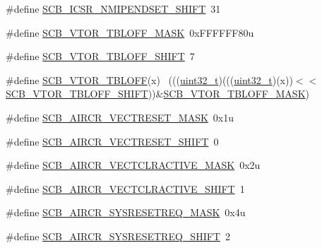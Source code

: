 \begin{DoxyCompactItemize}
\item 
\#define \hyperlink{group___s_c_b___register___masks_ga8a185fc794df7e755e5f3a8b3a06d042}{S\+C\+B\+\_\+\+I\+C\+S\+R\+\_\+\+N\+M\+I\+P\+E\+N\+D\+S\+E\+T\+\_\+\+S\+H\+I\+FT}~31
\item 
\#define \hyperlink{group___s_c_b___register___masks_ga07fd57e90baff628af14394c8142dc27}{S\+C\+B\+\_\+\+V\+T\+O\+R\+\_\+\+T\+B\+L\+O\+F\+F\+\_\+\+M\+A\+SK}~0x\+F\+F\+F\+F\+F\+F80u
\item 
\#define \hyperlink{group___s_c_b___register___masks_gac6092f3c78a9f126c2d02740a7976708}{S\+C\+B\+\_\+\+V\+T\+O\+R\+\_\+\+T\+B\+L\+O\+F\+F\+\_\+\+S\+H\+I\+FT}~7
\item 
\#define \hyperlink{group___s_c_b___register___masks_ga0fc8974ae1755bc9819c97712403b828}{S\+C\+B\+\_\+\+V\+T\+O\+R\+\_\+\+T\+B\+L\+O\+FF}(x)                                          ~(((\hyperlink{_p_e___types_8h_a33594304e786b158f3fb30289278f5af}{uint32\+\_\+t})(((\hyperlink{_p_e___types_8h_a33594304e786b158f3fb30289278f5af}{uint32\+\_\+t})(x))$<$$<$\hyperlink{group___s_c_b___register___masks_gac6092f3c78a9f126c2d02740a7976708}{S\+C\+B\+\_\+\+V\+T\+O\+R\+\_\+\+T\+B\+L\+O\+F\+F\+\_\+\+S\+H\+I\+FT}))\&\hyperlink{group___s_c_b___register___masks_ga07fd57e90baff628af14394c8142dc27}{S\+C\+B\+\_\+\+V\+T\+O\+R\+\_\+\+T\+B\+L\+O\+F\+F\+\_\+\+M\+A\+SK})
\item 
\#define \hyperlink{group___s_c_b___register___masks_gac4c28207a4bc452bd147dd820037eb08}{S\+C\+B\+\_\+\+A\+I\+R\+C\+R\+\_\+\+V\+E\+C\+T\+R\+E\+S\+E\+T\+\_\+\+M\+A\+SK}~0x1u
\item 
\#define \hyperlink{group___s_c_b___register___masks_ga55414e87d5441a65f2ddc8039a9472aa}{S\+C\+B\+\_\+\+A\+I\+R\+C\+R\+\_\+\+V\+E\+C\+T\+R\+E\+S\+E\+T\+\_\+\+S\+H\+I\+FT}~0
\item 
\#define \hyperlink{group___s_c_b___register___masks_ga185d1b709217248a97734877cf639eac}{S\+C\+B\+\_\+\+A\+I\+R\+C\+R\+\_\+\+V\+E\+C\+T\+C\+L\+R\+A\+C\+T\+I\+V\+E\+\_\+\+M\+A\+SK}~0x2u
\item 
\#define \hyperlink{group___s_c_b___register___masks_gacc6a889c36f0c9d996ab29dc076eec6e}{S\+C\+B\+\_\+\+A\+I\+R\+C\+R\+\_\+\+V\+E\+C\+T\+C\+L\+R\+A\+C\+T\+I\+V\+E\+\_\+\+S\+H\+I\+FT}~1
\item 
\#define \hyperlink{group___s_c_b___register___masks_gab69a066f25df4f52635379ca69f99b35}{S\+C\+B\+\_\+\+A\+I\+R\+C\+R\+\_\+\+S\+Y\+S\+R\+E\+S\+E\+T\+R\+E\+Q\+\_\+\+M\+A\+SK}~0x4u
\item 
\#define \hyperlink{group___s_c_b___register___masks_ga858136a0c46c0a91e00af704cb3e2eb8}{S\+C\+B\+\_\+\+A\+I\+R\+C\+R\+\_\+\+S\+Y\+S\+R\+E\+S\+E\+T\+R\+E\+Q\+\_\+\+S\+H\+I\+FT}~2
$$
\end{DoxyCompactItemize}
